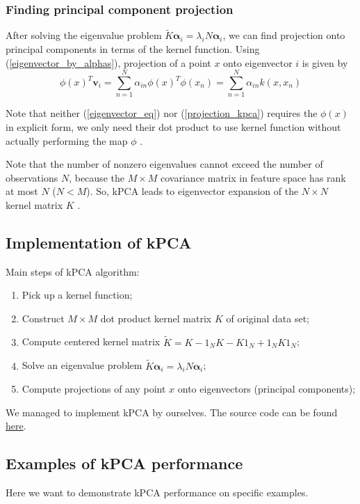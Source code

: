 \subsubsection{Finding principal component projection}
After solving the eigenvalue problem 
$\widetilde{K}\bm{\alpha}_i = \lambda_i N \bm{\alpha}_i$, 
we can find projection onto principal components in terms of the kernel function.
Using (\ref{eigenvector_by_alphas}), projection of a point $x$ onto eigenvector $i$ is given by
\begin{equation}\label{projection_kpca}
\phi(x)^T \bm{v}_i = \sum_{n=1}^{N}{\alpha_{in}\phi(x)^T\phi(x_n)} = \sum_{n=1}^{N}{\alpha_{in}k(x, x_n)}
\end{equation}

Note that neither (\ref{eigenvector_eq})  nor (\ref{projection_kpca}) requires the $\phi(x)$ in explicit form, we only need their dot product to use kernel function without actually performing the map $\phi$ \citep{original_paper}. 

Note that the number of nonzero eigenvalues cannot exceed the number of observations $N$, because
the $M \times M$ covariance matrix in feature space has rank at most $N$ ($N<M$). So, kPCA leads to eigenvector expansion of the $N \times N$ kernel matrix $K$ \citep{bishop}.

\pagebreak
\subsection{Implementation of kPCA}
Main steps of kPCA algorithm:
\begin{enumerate}
	\item Pick up a kernel function;
	\item Construct $M \times M$ dot product kernel matrix $K$ of original data set;
	\item Compute centered kernel matrix $\widetilde{K} = K - 1_N K - K 1_N + 1_N K 1_N$;	\item Solve an eigenvalue problem $\widetilde{K} \bm{\alpha}_i = \lambda_i N \bm{\alpha}_i$;
	\item Compute projections of any point $x$ onto eigenvectors (principal components);
\end{enumerate}
We managed to implement kPCA by ourselves. The source code can be found \href{https://github.com/Irynei/KernelPCA}{here}.

\subsection{Examples of kPCA performance}
Here we want to demonstrate kPCA performance on specific examples.

